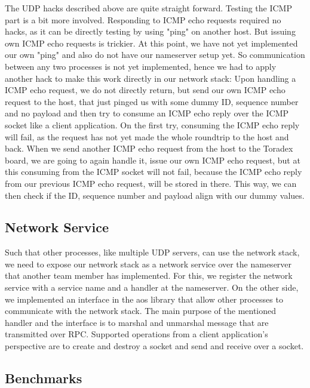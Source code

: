 The UDP hacks described above are quite straight forward. Testing the ICMP part is a bit more involved. Responding to ICMP echo requests required no hacks, as it can be directly testing by using "ping" on another host.
But issuing own ICMP echo requests is trickier. At this point, we have not yet implemented our own "ping" and also do not have our nameserver setup yet. So communication between any two processes is not yet implemented, hence we had to apply another hack to make this work directly in our network stack:
Upon handling a ICMP echo request, we do not directly return, but send our own ICMP echo request to the host, that just pinged us with some dummy ID, sequence number and no payload and then try to consume an ICMP echo reply over the ICMP socket like a client application. On the first try, consuming the ICMP echo reply will fail, as the request has not yet made the whole roundtrip to the host and back. When we send another ICMP echo request from the host to the Toradex board, we are going to again handle it, issue our own ICMP echo request, but at this consuming from the ICMP socket will not fail, because the ICMP echo reply from our previous ICMP echo request, will be stored in there. This way, we can then check if the ID, sequence number and payload align with our dummy values.


\subsection{Network Service}

Such that other processes, like multiple UDP servers, can use the network stack, we need to expose our network stack as a network service over the nameserver that another team member has implemented. 
For this, we register the network service with a service name and a handler at the nameserver. On the other side, we implemented an interface in the aos library that allow other processes to communicate with the network stack. The main purpose of the mentioned handler and the interface is to marshal and unmarshal message that are transmitted over RPC.
Supported operations from a client application's perspective are to create and destroy a socket and send and receive over a socket.

\subsection{Benchmarks}

